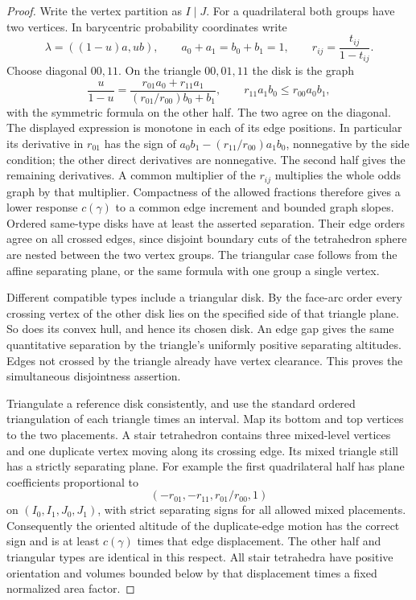 \begin{proof}
Write the vertex partition as $I\mid J$.  For a quadrilateral both
groups have two vertices.  In barycentric probability coordinates
write
\[
 \lambda=((1-u)a,ub),\qquad a_0+a_1=b_0+b_1=1,
 \qquad r_{ij}=\frac{t_{ij}}{1-t_{ij}}.
\]
Choose diagonal $00,11$.  On the triangle $00,01,11$ the disk is
the graph
\begin{equation}
 \frac{u}{1-u}
   =\frac{r_{01}a_0+r_{11}a_1}{(r_{01}/r_{00})b_0+b_1},
 \qquad r_{11}a_1b_0\le r_{00}a_0b_1,
 \label{ms:quad-graph}
\end{equation}
with the symmetric formula on the other half.  The two agree on the
diagonal.  The displayed expression is monotone in each of its edge
positions.  In particular its derivative in $r_{01}$ has the sign
of $a_0b_1-(r_{11}/r_{00})a_1b_0$, nonnegative by the side
condition; the other direct derivatives are nonnegative.  The
second half gives the remaining derivatives.  A common multiplier
of the $r_{ij}$ multiplies the whole odds graph by that multiplier.
Compactness of the allowed fractions therefore gives a lower
response $c(\gamma)$ to a common edge increment and bounded graph
slopes.  Ordered same-type disks have at least the asserted
separation.  Their edge orders agree on all crossed edges, since
disjoint boundary cuts of the tetrahedron sphere are nested between
the two vertex groups.  The triangular case follows from the
affine separating plane, or the same formula with one group a
single vertex.

Different compatible types include a triangular disk.  By the
face-arc order every crossing vertex of the other disk lies on the
specified side of that triangle plane.  So does its convex hull,
and hence its chosen disk.  An edge gap gives the same quantitative
separation by the triangle's uniformly positive separating
altitudes.  Edges not crossed by the triangle already have vertex
clearance.  This proves the simultaneous disjointness assertion.

Triangulate a reference disk consistently, and use the standard
ordered triangulation of each triangle times an interval.  Map its
bottom and top vertices to the two placements.  A stair tetrahedron
contains three mixed-level vertices and one duplicate vertex moving
along its crossing edge.  Its mixed triangle still has a strictly
separating plane.  For example the first quadrilateral half has
plane coefficients proportional to
\[
 (-r_{01},-r_{11},r_{01}/r_{00},1)
\]
on $(I_0,I_1,J_0,J_1)$, with strict separating signs for all allowed
mixed placements.  Consequently the oriented altitude of the
duplicate-edge motion has the correct sign and is at least
$c(\gamma)$ times that edge displacement.  The other half and
triangular types are identical in this respect.  All stair
tetrahedra have positive orientation and volumes bounded below by
that displacement times a fixed normalized area factor.


\end{proof}
